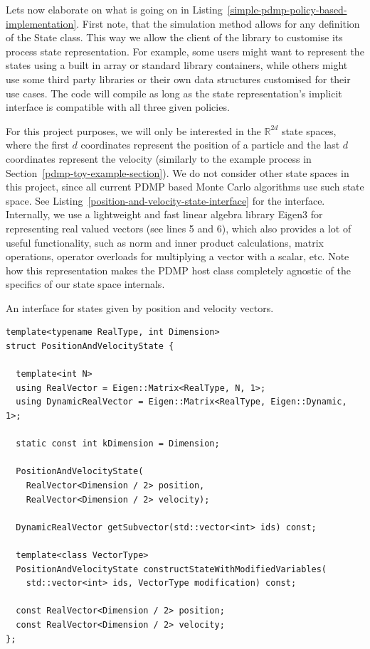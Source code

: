\documentclass[report.tex]{subfiles}
\begin{document}
Lets now elaborate on what is going on in Listing~\ref{simple-pdmp-policy-based-implementation}.
First note, that the simulation method allows for any definition of the State class.
This way we allow the client of the library to customise its process state representation.
For example, some users might want to represent the states using a built in array or
standard library containers, while others might use
some third party libraries or their own data structures customised for their use cases.
The code will compile as long as the state representation's implicit interface is
compatible with all three given policies.

For this project purposes, we will only be interested in the $\mathbb{R}^{2d}$ state
spaces, where the first $d$ coordinates represent the position of a particle
and the last $d$ coordinates represent the velocity (similarly to the example process in Section~\ref{pdmp-toy-example-section}).
We do not consider other state spaces in this project, since all current PDMP based
Monte Carlo algorithms use such state space.
See Listing~\ref{position-and-velocity-state-interface} for the interface.
Internally, we use a lightweight and fast linear algebra library Eigen3 \cite{eigenweb} for
representing real valued vectors (see lines 5 and 6), which also provides a lot of useful
functionality, such as norm and inner product calculations, matrix operations, operator overloads for multiplying
a vector with a scalar, etc.
Note how this representation makes the PDMP host class completely agnostic of the specifics
of our state space internals.

\begin{lstfloat}
\caption{An interface for states given by position and velocity vectors.}
\label{position-and-velocity-state-interface}
\begin{lstlisting}
template<typename RealType, int Dimension>
struct PositionAndVelocityState {

  template<int N>
  using RealVector = Eigen::Matrix<RealType, N, 1>;
  using DynamicRealVector = Eigen::Matrix<RealType, Eigen::Dynamic, 1>;

  static const int kDimension = Dimension;

  PositionAndVelocityState(
    RealVector<Dimension / 2> position,
    RealVector<Dimension / 2> velocity);

  DynamicRealVector getSubvector(std::vector<int> ids) const;

  template<class VectorType>
  PositionAndVelocityState constructStateWithModifiedVariables(
    std::vector<int> ids, VectorType modification) const;

  const RealVector<Dimension / 2> position;
  const RealVector<Dimension / 2> velocity;
};
\end{lstlisting}
\end{lstfloat}
\end{document}
